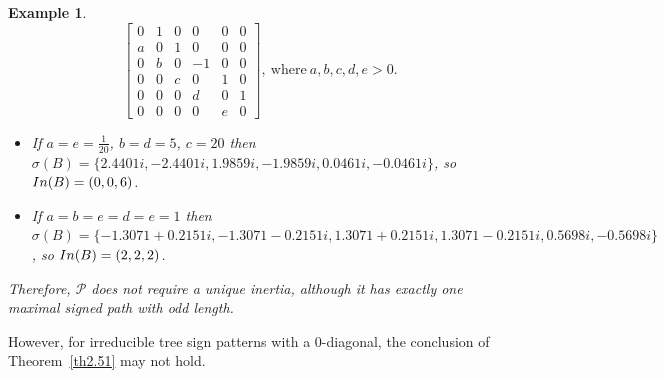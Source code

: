 \documentclass[10pt,a4paper]{amsart}
\newtheorem{eg}{Example}[section]
\numberwithin{equation}{section}
\def\In{{\rm In}}
\begin{document}
\begin{eg}
	$$\begin{bmatrix}
		0&1&0&0&0&0\\ a&0&1&0&0&0\\ 0&b&0&-1&0&0\\ 0&0&c&0&1&0\\0&0&0&d&0&1\\0&0&0&0&e&0
	\end{bmatrix}, ~\text{where}~ a,b,c,d,e>0.$$
	\begin{itemize}
		\item[i.] If $a=e=\frac{1}{20}$, $b=d=5$, $c=20$ then $\sigma(B)=\{ 2.4401i, - 2.4401i, 1.9859i,- 1.9859i, 0.0461i, - 0.0461i\}$, so $\In(B)=(0,0,6)$.
		\item[ii.] If $a=b=e=d=e=1$ then $\sigma(B)=\{-1.3071 + 0.2151i, -1.3071 - 0.2151i, 1.3071 + 0.2151i, 1.3071 - 0.2151i, 0.5698i, - 0.5698i\}$, so $\In(B)=(2,2,2)$.
	\end{itemize}
	Therefore, $\mathcal{P}$ does not require a unique inertia, although it has exactly one maximal signed path with odd length.
\end{eg}

However, for irreducible tree sign patterns with a $0$-diagonal, the conclusion of Theorem~\ref{th2.51} may not hold.
\end{document}
